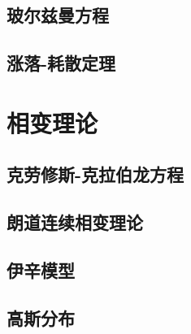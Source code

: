 \documentclass[a4paper]{report}
\begin{document}
\section{玻尔兹曼方程}
\section{涨落-耗散定理}
\chapter{相变理论}
\section{克劳修斯-克拉伯龙方程}
\section{朗道连续相变理论}
\section{伊辛模型}

\appendix
\section{高斯分布}

%
\end{document}
